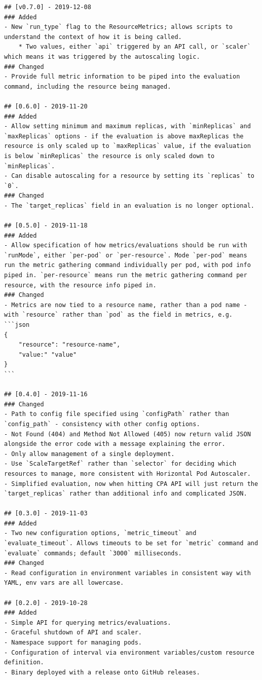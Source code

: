 \begin{lstlisting}
## [v0.7.0] - 2019-12-08
### Added
- New `run_type` flag to the ResourceMetrics; allows scripts to understand the context of how it is being called.
    * Two values, either `api` triggered by an API call, or `scaler` which means it was triggered by the autoscaling logic.
### Changed
- Provide full metric information to be piped into the evaluation command, including the resource being managed.

## [0.6.0] - 2019-11-20
### Added
- Allow setting minimum and maximum replicas, with `minReplicas` and `maxReplicas` options - if the evaluation is above maxReplicas the resource is only scaled up to `maxReplicas` value, if the evaluation is below `minReplicas` the resource is only scaled down to `minReplicas`.
- Can disable autoscaling for a resource by setting its `replicas` to `0`.
### Changed
- The `target_replicas` field in an evaluation is no longer optional.

## [0.5.0] - 2019-11-18
### Added
- Allow specification of how metrics/evaluations should be run with `runMode`, either `per-pod` or `per-resource`. Mode `per-pod` means run the metric gathering command individually per pod, with pod info piped in. `per-resource` means run the metric gathering command per resource, with the resource info piped in. 
### Changed
- Metrics are now tied to a resource name, rather than a pod name - with `resource` rather than `pod` as the field in metrics, e.g.
```json
{
    "resource": "resource-name",
    "value:" "value"
}
```

## [0.4.0] - 2019-11-16
### Changed
- Path to config file specified using `configPath` rather than `config_path` - consistency with other config options.
- Not Found (404) and Method Not Allowed (405) now return valid JSON alongside the error code with a message explaining the error.
- Only allow management of a single deployment.
- Use `ScaleTargetRef` rather than `selector` for deciding which resources to manage, more consistent with Horizontal Pod Autoscaler.
- Simplified evaluation, now when hitting CPA API will just return the `target_replicas` rather than additional info and complicated JSON.

## [0.3.0] - 2019-11-03
### Added
- Two new configuration options, `metric_timeout` and `evaluate_timeout`. Allows timeouts to be set for `metric` command and `evaluate` commands; default `3000` milliseconds.
### Changed
- Read configuration in environment variables in consistent way with YAML, env vars are all lowercase.

## [0.2.0] - 2019-10-28
### Added
- Simple API for querying metrics/evaluations.
- Graceful shutdown of API and scaler.
- Namespace support for managing pods.
- Configuration of interval via environment variables/custom resource definition.
- Binary deployed with a release onto GitHub releases.


\end{lstlisting}
